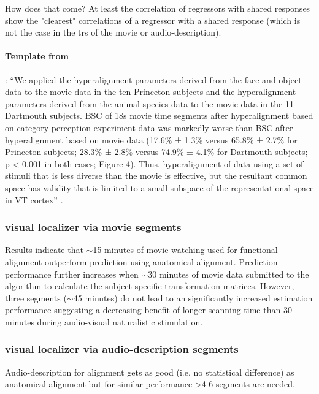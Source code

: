 How does that come? At least the correlation of regressors with shared responses
show the "clearest" correlations of a regressor with a shared response (which is
not the case in the \acp{tr} of the movie or audio-description).


\paragraph{Template from \citet{haxby2011common}}:
%
``We applied the hyperalignment parameters derived from the face and object data
to the movie data in the ten Princeton subjects and the hyperalignment
parameters derived from the animal species data to the movie data in the 11
Dartmouth subjects.
%
BSC of 18s movie time segments after hyperalignment based on category perception
experiment data was markedly worse than BSC after hyperalignment based on movie
data (17.6\% ± 1.3\% versus 65.8\% ± 2.7\% for Princeton subjects; 28.3\% ±
2.8\% versus 74.9\% ± 4.1\% for Dartmouth subjects; p < 0.001 in both cases;
Figure 4).
%
Thus, hyperalignment of data using a set of stimuli that is less diverse than
the movie is effective, but the resultant common space has validity that is
limited to a small subspace of the representational space in VT cortex''
\citep{haxby2011common}.


\subsubsection{visual localizer via movie segments}

%
Results indicate that $\sim$15 minutes of movie watching used for functional
alignment outperform prediction using anatomical alignment.
%
Prediction performance further increases when $\sim$30 minutes of movie data
submitted to the algorithm to calculate the subject-specific transformation
matrices.
%
However, three segments ($\sim$45 minutes) do not lead to an significantly
increased estimation performance suggesting a decreasing benefit of longer
scanning time than 30 minutes during audio-visual naturalistic stimulation.


\subsubsection{visual localizer via audio-description segments}

Audio-description for alignment gets as good (i.e. no statistical difference) as
anatomical alignment but for similar performance >4-6 segments are needed.



